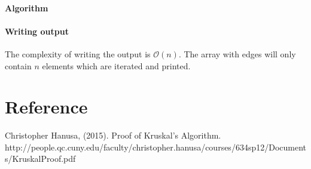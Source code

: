 \documentclass{article}
\newcommand{\bigO}[1]{\mathcal{O}(#1)}
\begin{document}
\paragraph{Algorithm}

\paragraph{Writing output}
The complexity of writing the output is $\bigO{n}$. The array with edges will only contain $n$ elements which are iterated and printed.

\section{Reference}

Christopher Hanusa, (2015). Proof of Kruskal’s Algorithm. \newline
http://people.qc.cuny.edu/faculty/christopher.hanusa/courses/634sp12/Documents/KruskalProof.pdf
\end{document}
